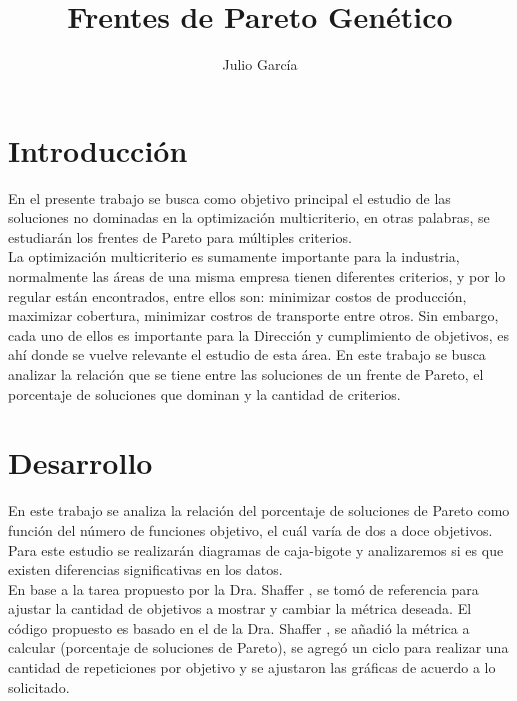 \documentclass{article}
\title {Frentes de Pareto Genético}
\author{Julio Garc\'ia}
\begin{document}
	\renewcommand{\listtablename}{Índice de tablas}
	\renewcommand{\tablename}{Cuadro}
	\maketitle
	
	\section{Introducción}
	En el presente trabajo se busca como objetivo principal el estudio de las soluciones no dominadas en la optimización multicriterio, en otras palabras, se estudiarán los frentes de Pareto para múltiples criterios.\\
	La optimización multicriterio es sumamente importante para la industria, normalmente las áreas de una misma empresa tienen diferentes criterios, y por lo regular están encontrados, entre ellos son: minimizar costos de producción, maximizar cobertura, minimizar costros de transporte entre otros. Sin embargo, cada uno de ellos es importante para la Dirección y cumplimiento de objetivos, es ahí donde se vuelve relevante el estudio de esta área. En este trabajo se busca analizar la relación que se tiene entre las soluciones de un frente de Pareto, el porcentaje de soluciones que dominan y la cantidad de criterios. 

	
	\section{Desarrollo}
	En este trabajo se analiza la relación del porcentaje de soluciones de Pareto como función del número de funciones objetivo, el cuál varía de dos a doce objetivos. Para este estudio se realizarán diagramas de caja-bigote y analizaremos si es que existen diferencias significativas en los datos.\\
	En base a la tarea propuesto por la Dra. Shaffer \cite{pa}, se tomó de referencia para ajustar la cantidad de objetivos a mostrar y cambiar la métrica deseada. El código propuesto es basado en el de la Dra. Shaffer \cite{pa1}, se añadió la métrica a calcular (porcentaje de soluciones de Pareto), se agregó un ciclo para realizar una cantidad de repeticiones por objetivo y se ajustaron las gráficas de acuerdo a lo solicitado.\\
\end{document}
